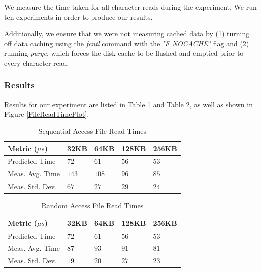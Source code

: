 \documentclass[sigconf]{acmart}
\begin{document}
We measure the time taken for all character reads during the experiment. We run ten experiments in order to produce our results.

Additionally, we ensure that we were not measuring cached data by (1) turning off data caching using the \textit{fcntl} command with the \textit{"F NOCACHE"} flag and (2) running \textit{purge}, which forces the disk cache to be flushed and emptied prior to every character read.

\subsubsection{Results}
Results for our experiment are listed in Table \ref{SequentialFileReadTimes} and Table \ref{RandomFileReadTimes}, as well as shown in Figure \ref{FileReadTimePlot}.

\begin{table}[h!]
\centering
\caption{Sequential Access File Read Times}
\label{SequentialFileReadTimes}
\begin{tabular}{|l|l|l|l|l|}
\hline
\textbf{Metric ($\mu s$)}	& \textbf{32KB}	& \textbf{64KB}	& \textbf{128KB}  & \textbf{256KB}  \\ \hline
Predicted Time				& $72$			& $61$			& $56$			& $53$				\\ \hline
Meas. Avg. Time				& $143$			& $108$			& $96$			& $85$				\\ \hline
Meas. Std. Dev.				& $67$			& $27$			& $29$			& $24$				\\ \hline
\end{tabular}
\end{table}

\begin{table}[h!]
\centering
\caption{Random Access File Read Times}
\label{RandomFileReadTimes}
\begin{tabular}{|l|l|l|l|l|}
\hline
\textbf{Metric ($\mu s$)}	& \textbf{32KB} & \textbf{64KB}	& \textbf{128KB}	& \textbf{256KB}	\\ \hline
Predicted Time				& $72$			& $61$			& $56$				& $53$				\\ \hline
Meas. Avg. Time				& $87$			& $93$			& $91$				& $81$				\\ \hline
Meas. Std. Dev.				& $19$			& $20$			& $27$				& $23$				\\ \hline
\end{tabular}
\end{table}
\end{document}
